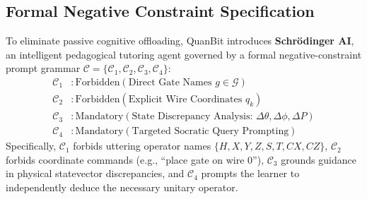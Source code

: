 \documentclass[11pt, a4paper]{article}
\begin{document}
\subsection{Formal Negative Constraint Specification}
To eliminate passive cognitive offloading, QuanBit introduces \textbf{Schr{\"o}dinger AI}, an intelligent pedagogical tutoring agent governed by a formal negative-constraint prompt grammar $\mathcal{C} = \{\mathcal{C}_1, \mathcal{C}_2, \mathcal{C}_3, \mathcal{C}_4\}$:
\begin{equation}
\label{eq:ai_rules}
\begin{aligned}
\mathcal{C}_1 &: \text{Forbidden}(\text{Direct Gate Names } g \in \mathcal{G}) \\
\mathcal{C}_2 &: \text{Forbidden}(\text{Explicit Wire Coordinates } q_k) \\
\mathcal{C}_3 &: \text{Mandatory}(\text{State Discrepancy Analysis: } \Delta\theta, \Delta\phi, \Delta P) \\
\mathcal{C}_4 &: \text{Mandatory}(\text{Targeted Socratic Query Prompting})
\end{aligned}
\end{equation}
Specifically, $\mathcal{C}_1$ forbids uttering operator names $\{H, X, Y, Z, S, T, CX, CZ\}$, $\mathcal{C}_2$ forbids coordinate commands (e.g., ``place gate on wire 0''), $\mathcal{C}_3$ grounds guidance in physical statevector discrepancies, and $\mathcal{C}_4$ prompts the learner to independently deduce the necessary unitary operator.
\end{document}
